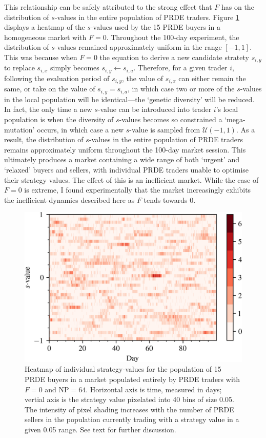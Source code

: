 \documentclass[conference]{IEEEtran}
\begin{document}
This relationship can be safely attributed to the strong effect that $F$ has on the distribution of $s$-values in the entire population of PRDE traders.
Figure \ref{k=4,F=0.0_buy_strats} displays a heatmap of the $s$-values used by the 15 PRDE buyers in a homogeneous market with $F=0$.
Throughout the 100-day experiment, the distribution of $s$-values remained approximately uniform in the range $[-1, 1]$.
This was because when $F=0$ the equation to derive a new candidate stratety $s_{i,y}$ to replace $s_{i,x}$ simply becomes $s_{i,y}\leftarrow s_{i,a}$.
Therefore, for a given trader $i$, following the evaluation period of $s_{i,y}$, the value of $s_{i,x}$ can either remain the same, or take on the value of $s_{i,y}=s_{i,a}$, in which case two or more of the $s$-values in the local population will be identical---the `genetic diversity' will be reduced.
In fact, the only time a new $s$-value can be introduced into trader $i$'s local population is when the diversity of $s$-values becomes so constrained a `mega-mutation' occurs, in which case a new $s$-value is sampled from $\mathcal{U}(-1,1)$.
As a result, the distribution of $s$-values in the entire population of PRDE traders remains approximately uniform throughout the 100-day market session.
This ultimately produces a market containing a wide range of both `urgent' and `relaxed' buyers and sellers, with individual PRDE traders unable to optimise their strategy values.
The effect of this is an inefficient market.
While the case of $F=0$ is extreme, I found experimentally that the market increasingly exhibits the inefficient dynamics described here as $F$ tends towards $0$.

\begin{figure}[htbp]
    \centerline{\includegraphics[width=\columnwidth]{k=4,F=0.0_buy_strats.png}}
    \caption{
        Heatmap of individual strategy-values for the population of 15 PRDE buyers in a market populated entirely by PRDE traders with $F=0$ and $\mathrm{NP}=64$.
        Horizontal axis is time, measured in days; vertial axis is the strategy value pixelated into 40 bins of size 0.05.
        The intensity of pixel shading increases with the number of PRDE sellers in the population currently trading with a strategy value in a given 0.05 range.
        See text for further discussion.
    }
    \label{k=4,F=0.0_buy_strats}
\end{figure}
\end{document}
